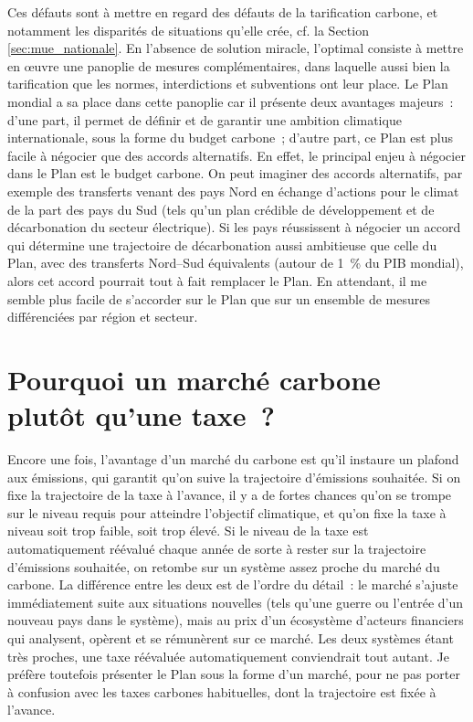\documentclass[a5paper,french]{memoir}
\begin{document}
Ces défauts sont à mettre en regard des défauts de la tarification carbone, et notamment les disparités de situations qu'elle crée, cf. la Section \ref{sec:mue_nationale}. En l'absence de solution miracle, l'optimal consiste à mettre en œuvre une panoplie de mesures complémentaires, dans laquelle aussi bien la tarification que les normes, interdictions et subventions ont leur place. Le Plan mondial a sa place dans cette panoplie car il présente deux avantages majeurs~: d'une part, il permet de définir et de garantir une ambition climatique internationale, sous la forme du budget carbone~; d'autre part, ce Plan est plus facile à négocier que des accords alternatifs. En effet, le principal enjeu à négocier dans le Plan est le budget carbone. On peut imaginer des accords alternatifs, par exemple des transferts venant des pays Nord en échange d'actions pour le climat de la part des pays du Sud (tels qu'un plan crédible de développement et de décarbonation du secteur électrique). Si les pays réussissent à négocier un accord qui détermine une trajectoire de décarbonation aussi ambitieuse que celle du Plan, avec des transferts Nord--Sud équivalents (autour de 1~\% du PIB mondial), alors cet accord pourrait tout à fait remplacer le Plan. En attendant, il me semble plus facile de s'accorder sur le Plan que sur un ensemble de mesures différenciées par région et secteur.


\section*{\normalsize Pourquoi un marché carbone plutôt qu'une taxe~?}\label{q:taxe}

Encore une fois, l'avantage d'un marché du carbone est qu'il instaure un plafond aux émissions, qui garantit qu'on suive la trajectoire d'émissions souhaitée. Si on fixe la trajectoire de la taxe à l'avance, il y a de fortes chances qu'on se trompe sur le niveau requis pour atteindre l'objectif climatique, et qu'on fixe la taxe à niveau soit trop faible, soit trop élevé. Si le niveau de la taxe est automatiquement réévalué chaque année de sorte à rester sur la trajectoire d'émissions souhaitée, on retombe sur un système assez proche du marché du carbone. La différence entre les deux est de l'ordre du détail~: le marché s'ajuste immédiatement suite aux situations nouvelles (tels qu'une guerre ou l'entrée d'un nouveau pays dans le système), mais au prix d'un écosystème d'acteurs financiers qui analysent, opèrent et se rémunèrent sur ce marché. Les deux systèmes étant très proches, une taxe réévaluée automatiquement conviendrait tout autant. Je préfère toutefois présenter le Plan sous la forme d'un marché, pour ne pas porter à confusion avec les taxes carbones habituelles, dont la trajectoire est fixée à l'avance. 
\end{document}
